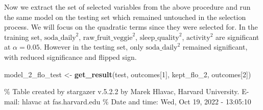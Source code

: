 \documentclass[
]{article}
\newenvironment{Shaded}{\begin{snugshade}}{\end{snugshade}}
\newcommand{\DecValTok}[1]{\textcolor[rgb]{0.00,0.00,0.81}{#1}}
\newcommand{\KeywordTok}[1]{\textcolor[rgb]{0.13,0.29,0.53}{\textbf{#1}}}
\newcommand{\NormalTok}[1]{#1}
\newcommand{\StringTok}[1]{\textcolor[rgb]{0.31,0.60,0.02}{#1}}
\begin{document}
Now we extract the set of selected variables from the above procedure
and run the same model on the testing set which remained untouched in
the selection process. We will focus on the quadratic terms since they
were selected for. In the training set, \(\text{soda_daily}^2\),
\(\text{raw_fruit_veggie}^2\), \(\text{sleep_quality}^2\),
\(\text{activity}^2\) are significant at \(\alpha = 0.05\). However in
the testing set, only \(\text{soda_daily}^2\) remained significant, with
reduced significance and flipped sign.

\begin{Shaded}
\begin{Highlighting}[]
\NormalTok{model_}\DecValTok{2}\NormalTok{_flo_test <-}\StringTok{ }\KeywordTok{get_result}\NormalTok{(test, outcomes[}\DecValTok{1}\NormalTok{], kept_flo_}\DecValTok{2}\NormalTok{, outcomes[}\DecValTok{2}\NormalTok{])}
\end{Highlighting}
\end{Shaded}

\% Table created by stargazer v.5.2.2 by Marek Hlavac, Harvard
University. E-mail: hlavac at fas.harvard.edu \% Date and time: Wed, Oct
19, 2022 - 13:05:10
\end{document}
